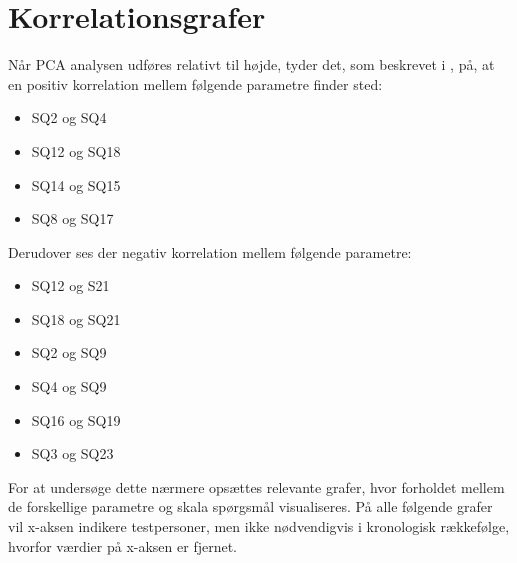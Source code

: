 \section{Korrelationsgrafer}
\label{DatabehandlingKorrelationsgrafer}
%
Når PCA analysen udføres relativt til højde, tyder det, som beskrevet i , på, at en positiv korrelation mellem følgende parametre finder sted:
\begin{itemize}
	\item SQ2 og SQ4
	\item SQ12 og SQ18
	\item SQ14 og SQ15
	\item SQ8 og SQ17
\end{itemize}
%
Derudover ses der negativ korrelation mellem følgende parametre:
\begin{itemize}
	\item SQ12 og S21
	\item SQ18 og SQ21
	\item SQ2 og SQ9
	\item SQ4 og SQ9
	\item SQ16 og SQ19
	\item SQ3 og SQ23
\end{itemize}
%
For at undersøge dette nærmere opsættes relevante grafer, hvor forholdet mellem de forskellige parametre og skala spørgsmål visualiseres. På alle følgende grafer vil x-aksen indikere testpersoner, men ikke nødvendigvis i kronologisk rækkefølge, hvorfor værdier på x-aksen er fjernet.

